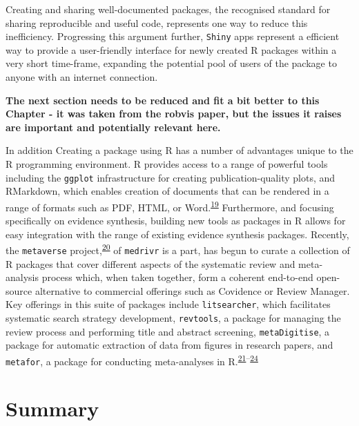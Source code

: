 \documentclass[a4paper, twoside]{templates/ociamthesis}
\begin{document}
Creating and sharing well-documented packages, the recognised standard for sharing reproducible and useful code, represents one way to reduce this inefficiency.
Progressing this argument further, \texttt{Shiny} apps represent a efficient way to provide a user-friendly interface for newly created R packages within a very short time-frame, expanding the potential pool of users of the package to anyone with an internet connection.

\begin{correction}
\textbf{The next section needs to be reduced and fit a bit better to
this Chapter - it was taken from the robvis paper, but the issues it
raises are important and potentially relevant here.}
\end{correction}

In addition
Creating a package using R has a number of advantages unique to the R programming environment. R provides access to a range of powerful tools including the \texttt{ggplot} infrastructure for creating publication-quality plots, and RMarkdown, which enables creation of documents that can be rendered in a range of formats such as PDF, HTML, or Word.\textsuperscript{\protect\hyperlink{ref-xie2018r}{19}} Furthermore, and focusing specifically on evidence synthesis, building new tools as packages in R allows for easy integration with the range of existing evidence synthesis packages. Recently, the \texttt{metaverse} project,\textsuperscript{\protect\hyperlink{ref-variousauthors2020}{20}} of \texttt{medrivr} is a part, has begun to curate a collection of R packages that cover different aspects of the systematic review and meta-analysis process which, when taken together, form a coherent end-to-end open-source alternative to commercial offerings such as Covidence or Review Manager. Key offerings in this suite of packages include \texttt{litsearcher}, which facilitates systematic search strategy development, \texttt{revtools}, a package for managing the review process and performing title and abstract screening, \texttt{metaDigitise}, a package for automatic extraction of data from figures in research papers, and \texttt{metafor}, a package for conducting meta-analyses in R.\textsuperscript{\protect\hyperlink{ref-grames2019automated}{21}--\protect\hyperlink{ref-westgate2019revtools}{24}}

\hypertarget{summary-2}{%
\section{Summary}\label{summary-2}}
\end{document}
